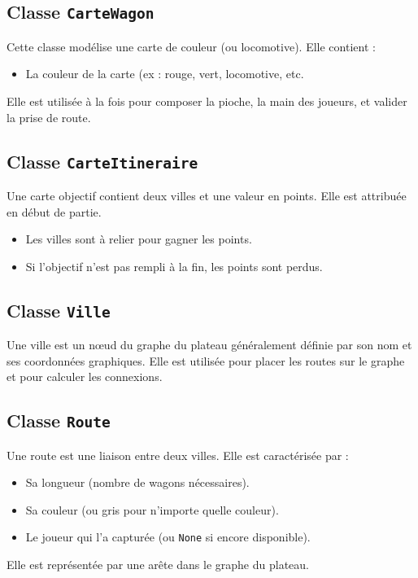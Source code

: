 \documentclass[a4paper,12pt]{report}
\begin{document}
\subsection*{Classe \texttt{CarteWagon}}

Cette classe modélise une carte de couleur (ou locomotive). Elle contient :
\begin{itemize}
    \item La couleur de la carte (ex : rouge, vert, locomotive, etc.
\end{itemize}
Elle est utilisée à la fois pour composer la pioche, la main des joueurs, et valider la prise de route.

\subsection*{Classe \texttt{CarteItineraire}}

Une carte objectif contient deux villes et une valeur en points. Elle est attribuée en début de partie.
\begin{itemize}
    \item Les villes sont à relier pour gagner les points.
    \item Si l’objectif n’est pas rempli à la fin, les points sont perdus.
\end{itemize}

\subsection*{Classe \texttt{Ville}}

Une ville est un nœud du graphe du plateau généralement définie par son nom et ses coordonnées graphiques.
Elle est utilisée pour placer les routes sur le graphe et pour calculer les connexions.

\subsection*{Classe \texttt{Route}}

Une route est une liaison entre deux villes. Elle est caractérisée par :
\begin{itemize}
    \item Sa longueur (nombre de wagons nécessaires).
    \item Sa couleur (ou gris pour n’importe quelle couleur).
    \item Le joueur qui l’a capturée (ou \texttt{None} si encore disponible).
\end{itemize}
Elle est représentée par une arête dans le graphe du plateau.
\end{document}
